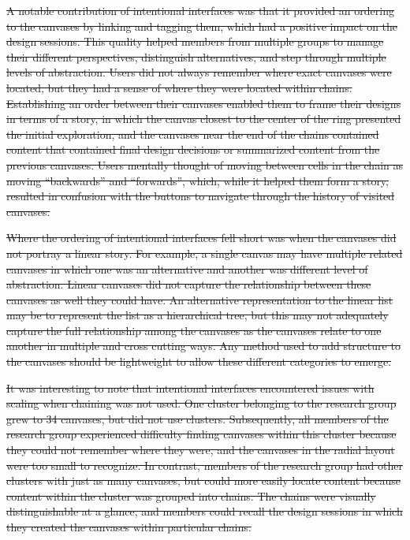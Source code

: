 \documentclass[12pt,fleqn]{ucithesis}
\providecommand{\DIFdeltex}[1]{{\protect\color{red}\sout{#1}}}                      %
\providecommand{\DIFdel}[1]{\texorpdfstring{\DIFdeltex{#1}}{}} %
\begin{document}
\DIFdel{A notable contribution of intentional interfaces was that it provided an ordering to the canvases by linking and tagging them, which had a positive impact on the design sessions. This quality helped members from multiple groups to manage their different perspectives, distinguish alternatives, and step through multiple levels of abstraction. Users did not always remember where exact canvases were located, but they had a sense of where they were located within chains. Establishing an order between their canvases enabled them to frame their designs in terms of a story, in which the canvas closest to the center of the ring presented the initial exploration, and the canvases near the end of the chains contained content that contained final design decisions or summarized content from the previous canvases. Users mentally thought of moving between cells in the chain as moving ``backwards'' and ``forwards'', which, while it helped them form a story, resulted in confusion with the buttons to navigate through the history of visited canvases.
}%

\DIFdel{Where the ordering of intentional interfaces fell short was when the canvases did not portray a linear story. For example, a single canvas may have multiple related canvases in which one was an alternative and another was different level of abstraction. Linear canvases did not capture the relationship between these canvases as well they could have. An alternative representation to the linear list may be to represent the list as a hierarchical tree, but this may not adequately capture the full relationship among the canvases as the canvases relate to one another in multiple and cross cutting ways. Any method used to add structure to the canvases should be lightweight to allow these different categories to emerge.
}%

\DIFdel{It was interesting to note that intentional interfaces encountered issues with scaling when chaining was not used. One cluster belonging to the research group grew to 34 canvases, but did not use clusters. Subsequently, all members of the research group experienced difficulty finding canvases within this cluster because they could not remember where they were, and the canvases in the radial layout were too small to recognize. In contrast, members of the research group had other clusters with just as many canvases, but could more easily locate content because content within the cluster was grouped into chains. The chains were visually distinguishable at a glance, and members could recall the design sessions in which they created the canvases within particular chains.
}%
\end{document}
